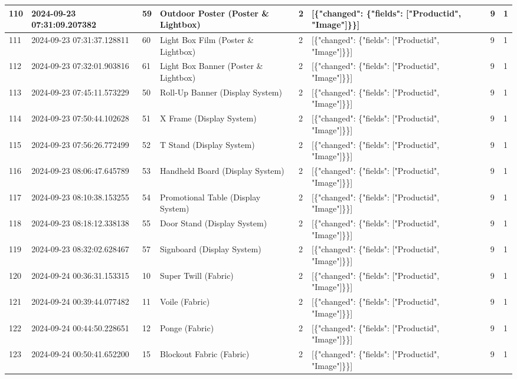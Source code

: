 \begin{longtable}{|l|l|l|l|l|l|l|l|}
110 & 2024-09-23 07:31:09.207382 & 59 & Outdoor Poster (Poster \& Lightbox) & 2 & [\{"changed": \{"fields": ["Productid", "Image"]\}\}] & 9 & 1 \\ \hline 
111 & 2024-09-23 07:31:37.128811 & 60 & Light Box Film (Poster \& Lightbox) & 2 & [\{"changed": \{"fields": ["Productid", "Image"]\}\}] & 9 & 1 \\ \hline 
112 & 2024-09-23 07:32:01.903816 & 61 & Light Box Banner (Poster \& Lightbox) & 2 & [\{"changed": \{"fields": ["Productid", "Image"]\}\}] & 9 & 1 \\ \hline 
113 & 2024-09-23 07:45:11.573229 & 50 & Roll-Up Banner (Display System) & 2 & [\{"changed": \{"fields": ["Productid", "Image"]\}\}] & 9 & 1 \\ \hline 
114 & 2024-09-23 07:50:44.102628 & 51 & X Frame (Display System) & 2 & [\{"changed": \{"fields": ["Productid", "Image"]\}\}] & 9 & 1 \\ \hline 
115 & 2024-09-23 07:56:26.772499 & 52 & T Stand (Display System) & 2 & [\{"changed": \{"fields": ["Productid", "Image"]\}\}] & 9 & 1 \\ \hline 
116 & 2024-09-23 08:06:47.645789 & 53 & Handheld Board (Display System) & 2 & [\{"changed": \{"fields": ["Productid", "Image"]\}\}] & 9 & 1 \\ \hline 
117 & 2024-09-23 08:10:38.153255 & 54 & Promotional Table (Display System) & 2 & [\{"changed": \{"fields": ["Productid", "Image"]\}\}] & 9 & 1 \\ \hline 
118 & 2024-09-23 08:18:12.338138 & 55 & Door Stand (Display System) & 2 & [\{"changed": \{"fields": ["Productid", "Image"]\}\}] & 9 & 1 \\ \hline 
119 & 2024-09-23 08:32:02.628467 & 57 & Signboard (Display System) & 2 & [\{"changed": \{"fields": ["Productid", "Image"]\}\}] & 9 & 1 \\ \hline 
120 & 2024-09-24 00:36:31.153315 & 10 & Super Twill (Fabric) & 2 & [\{"changed": \{"fields": ["Productid", "Image"]\}\}] & 9 & 1 \\ \hline 
121 & 2024-09-24 00:39:44.077482 & 11 & Voile (Fabric) & 2 & [\{"changed": \{"fields": ["Productid", "Image"]\}\}] & 9 & 1 \\ \hline 
122 & 2024-09-24 00:44:50.228651 & 12 & Ponge (Fabric) & 2 & [\{"changed": \{"fields": ["Productid", "Image"]\}\}] & 9 & 1 \\ \hline 
123 & 2024-09-24 00:50:41.652200 & 15 & Blockout Fabric (Fabric) & 2 & [\{"changed": \{"fields": ["Productid", "Image"]\}\}] & 9 & 1 \\ \hline 
 \end{longtable}

